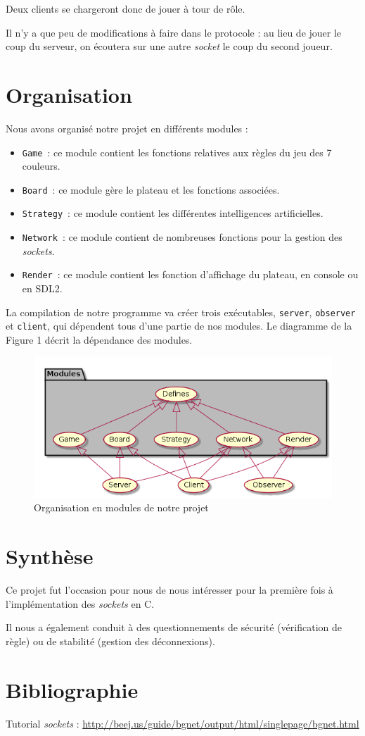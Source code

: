 \documentclass[12pt]{article}
\def\sec#1{\section{#1}}
\begin{document}
Deux clients se chargeront donc de jouer à tour de rôle.

Il n'y a que peu de modifications à faire dans le protocole : au lieu de jouer le coup du serveur, on écoutera sur une autre \textit{socket} le coup du second joueur.


\sec{Organisation}

Nous avons organisé notre projet en différents modules : 
\begin{itemize}
\item \texttt{Game}\ : ce module contient les fonctions relatives aux règles du jeu des 7 couleurs.
\item \texttt{Board}\ : ce module gère le plateau et les fonctions associées. 
\item \texttt{Strategy}\ : ce module contient les différentes intelligences artificielles. 
\item \texttt{Network}\ : ce module contient de nombreuses fonctions pour la gestion des \textit{sockets}.
\item \texttt{Render}\ : ce module contient les fonction d'affichage du plateau, en console ou en SDL2.
\end{itemize}

La compilation de notre programme va créer trois exécutables, \texttt{server}, \texttt{observer} et \texttt{client}, qui dépendent tous d'une partie de nos modules. Le diagramme de la Figure 1 décrit la dépendance des modules. \\


\begin{figure}
\begin{center}
\includegraphics[scale=0.6]{diagramme.png}
\caption{Organisation en modules de notre projet}
\end{center}
\end{figure}


\sec{Synthèse}

Ce projet fut l'occasion pour nous de nous intéresser pour la première fois à l'implémentation des \textit{sockets} en C.

Il nous a également conduit à des questionnements de sécurité (vérification de règle) ou de stabilité (gestion des déconnexions).

\sec{Bibliographie}
Tutorial \textit{sockets} : \url{http://beej.us/guide/bgnet/output/html/singlepage/bgnet.html}
\end{document}
